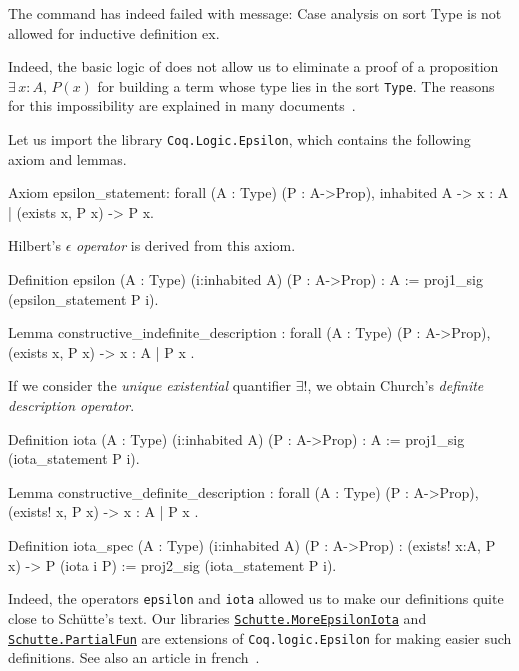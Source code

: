 \documentclass[a4paper]{book}
\begin{document}
\begin{Coqanswer}
The command has indeed failed with message:
Case analysis on sort Type is not allowed for inductive 
definition ex.
\end{Coqanswer}


Indeed, the basic logic of  \coq{} does not allow us to eliminate a proof of a proposition 
$\exists\,x:A,\,P(x)$ for building a term whose type lies in the sort \texttt{Type}. 
The reasons for this impossibility are explained in many documents~\cite{BC04, chlipalacpdt2011, Coq}.

Let us import the library \texttt{Coq.Logic.Epsilon}, which contains the following axiom and lemmas.


\begin{Coqsrc}
Axiom epsilon_statement:
  forall (A : Type) (P : A->Prop), inhabited A ->
    {x : A | (exists x, P x) -> P x}.
\end{Coqsrc}

Hilbert's $\epsilon$ \emph{operator} is derived from this  axiom.

\begin{Coqsrc}
  Definition epsilon (A : Type) (i:inhabited A) (P : A->Prop) : A
  := proj1_sig (epsilon_statement P i).

Lemma constructive_indefinite_description :
  forall (A : Type) (P : A->Prop),
    (exists x, P x) -> { x : A | P x }.
\end{Coqsrc}




If we consider the \emph{unique existential} quantifier $\exists!$, we obtain
Church's \emph{definite description operator}.

\begin{Coqsrc}
Definition iota (A : Type) (i:inhabited A) (P : A->Prop) : A
  := proj1_sig (iota_statement P i).
\end{Coqsrc}


\begin{Coqsrc}
 Lemma constructive_definite_description :
  forall (A : Type) (P : A->Prop),
    (exists! x, P x) -> { x : A | P x }.
\end{Coqsrc}


\begin{Coqsrc}
Definition iota_spec (A : Type) (i:inhabited A) (P : A->Prop) :
  (exists! x:A, P x) -> P (iota i P)
  := proj2_sig (iota_statement P i).
\end{Coqsrc}



Indeed, the operators \texttt{epsilon} and \texttt{iota} allowed us to make our definitions 
quite close to Schütte's text. Our libraries \href{../src/html/hydras.Schutte.MoreEpsilonIota.html}%
{\texttt{Schutte.MoreEpsilonIota}}
and
\href{../src/html/hydras.Schutte.PartialFun.html}%
{\texttt{Schutte.PartialFun}} are extensions of \texttt{Coq.logic.Epsilon} for making easier 
such definitions. See also an article in french~\cite{PCiota}. 
\end{document}
